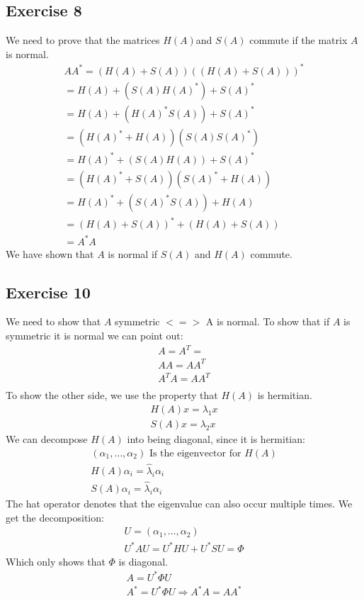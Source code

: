 \subsection{Exercise 8}
We need to prove that the matrices $H(A) $and $S(A)$ commute if the matrix $A$ is normal.
\begin{gather*}
AA^* = \left(  H(A) + S(A) \right) \left( \left( H(A) + S(A)  \right) \right)^* \\
=  H(A) + \left( S(A) H(A)^* \right) + S(A)^*  \\
=  H(A) + \left( H(A)^* S(A) \right) + S(A)^* \\
= \left( H(A)^* + H(A) \right) \left( S(A) S(A)^* \right)\\
= H(A)^* +  ( S(A) H(A) ) + S(A)^* \\
= (H(A)^* + S(A)) ( S(A)^* + H(A))\\
= H(A)^* + (S(A)^* S(A)) + H(A) \\
= (H(A)+S(A))^* + (H(A) + S(A))\\
= A^*A
\end{gather*}
We have shown that $A$ is normal if $S(A) $ and $H(A)$ commute.
\subsection{Exercise 10}
We need to show that $ A $ symmetric $<=>$ A is normal.
To show that if $A$ is symmetric it is normal we can point out:  
\begin{gather*}
A = A^T = \\
A A = A A^T \\
A^T A = A A^T\\
\end{gather*}
To show the other side, we use the property that $H(A)$ is hermitian.
\begin{gather*}
H(A) x = \lambda_1 x\\
S(A) x = \lambda_2 x
\end{gather*}
We can decompose $H(A)$ into being diagonal, since it is hermitian:
\begin{gather*}
\left( \alpha_1, \ldots , \alpha_2  \right) \text{ Is the eigenvector for } H(A) \\
H(A) \alpha_i = \hat{\lambda}_i \alpha_i \\
S(A) \alpha_i = \hat{\lambda}_i \alpha_i
\end{gather*}
The hat operator denotes that the eigenvalue can also occur multiple times.
We get the decomposition:
\begin{gather*}
U = \left( \alpha_1, \ldots , \alpha_2  \right)\\
U^* A U = U^* H U + U^* S U = \Phi 
\end{gather*}
Which only shows that $\Phi$ is diagonal.
\begin{gather*}
A = U^* \Phi U \\
A^* = U^* \Phi U \Rightarrow A^* A = A A^* 
\end{gather*}
